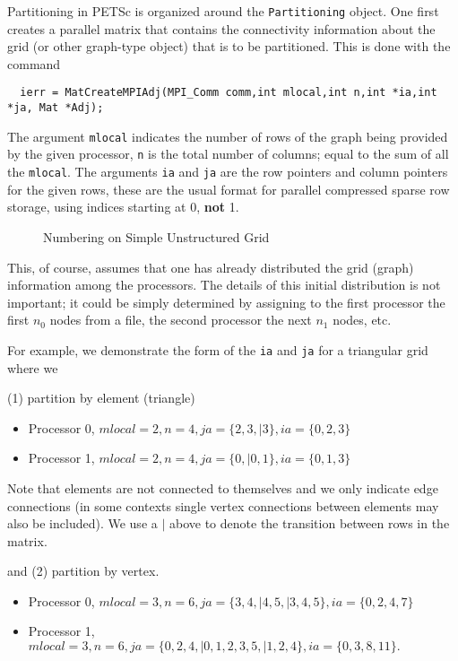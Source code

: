 Partitioning in PETSc is organized around the {\tt Partitioning} object. 
One first creates a parallel matrix that contains the connectivity information about the 
grid (or other graph-type object) that is to be partitioned. This is done with the 
command
\begin{verbatim}
  ierr = MatCreateMPIAdj(MPI_Comm comm,int mlocal,int n,int *ia,int *ja, Mat *Adj);
\end{verbatim}
The argument {\tt mlocal} indicates the number of rows of the graph being provided
by the given processor, {\tt n} is the total number of columns; equal to the 
sum of all the {\tt mlocal}. The arguments {\tt ia} and {\tt ja} are the row pointers
and column pointers for the given rows, these are the usual format for parallel 
compressed sparse row storage, using indices starting at 0, {\bf not} 1.

\begin{figure}[tb]
\centerline{}
\caption{Numbering on Simple Unstructured Grid}
\label{fig:usg}
\end{figure}

This, of course, assumes that one has already distributed the grid (graph) information
among the processors. The details of this initial distribution is not important; it 
could be simply determined by assigning to the first processor the first $n_0$ nodes
from a file, the second processor the next $ n_1$ nodes, etc.

For example, we demonstrate the form of the {\tt ia} and {\tt ja} for a triangular
grid where we 

(1) partition by element (triangle) 
\begin{itemize}
  \item Processor 0, $ mlocal = 2, n = 4, ja = \{2, 3,| 3\}, ia = \{0, 2, 3\} $
  \item Processor 1, $ mlocal = 2, n = 4, ja = \{0, | 0, 1\}, ia = \{0, 1, 3\} $
\end{itemize}
Note that elements are not connected to themselves and we only indicate edge connections
(in some contexts single vertex connections between elements may also be included). We use a
$ | $ above to denote the transition between rows in the matrix.

and (2) partition by vertex.
\begin{itemize}
  \item Processor 0, $ mlocal = 3, n = 6, ja = \{3, 4, | 4, 5, | 3, 4, 5\}, ia = \{0, 2, 4, 7\} $
  \item Processor 1, $ mlocal = 3, n = 6, ja = \{0, 2, 4, |  0, 1, 2, 3, 5,|  1, 2, 4\}, ia = \{0, 3, 8, 11\}. $
\end{itemize}



